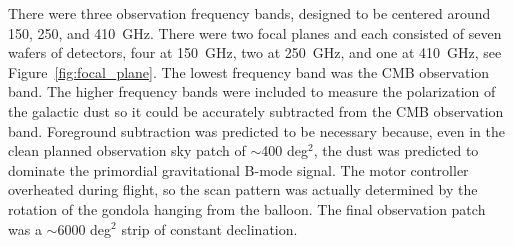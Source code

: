 There were three observation frequency bands, designed to be centered around 150, 250, and 410~GHz. 
There were two focal planes and each consisted of seven wafers of detectors, four at 150~GHz, two at 250~GHz, and one at 410~GHz, see Figure~\ref{fig:focal_plane}.
The lowest frequency band was the \ac{CMB} observation band. 
The higher frequency bands were included to measure the polarization of the galactic dust so it could be accurately subtracted from the \ac{CMB} observation band. 
Foreground subtraction was predicted to be necessary because, even in the clean planned observation sky patch of $\sim$400 deg$^2$, the dust was predicted to dominate the primordial gravitational B-mode signal. 
The motor controller overheated during flight, so the scan pattern was actually determined by the rotation of the gondola hanging from the balloon. 
The final observation patch was a $\sim$6000 deg$^2$ strip of constant declination.%

